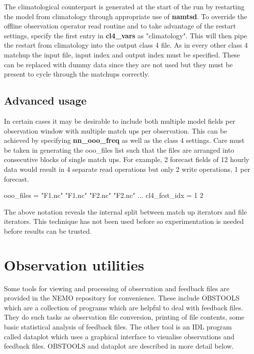 \documentclass[../main/NEMO_manual]{subfiles}
\begin{document}
The climatological counterpart is generated at the start of the run by
restarting the model from climatology through appropriate use of \textbf{namtsd}.
To override the offline observation operator read routine and to take advantage of the restart settings,
specify the first entry in \textbf{cl4\_vars} as "climatology".
This will then pipe the restart from climatology into the output class 4 file.
As in every other class 4 matchup the input file, input index and output index must be specified.
These can be replaced with dummy data since they are not used but
they must be present to cycle through the matchups correctly. 

\subsection{Advanced usage}

In certain cases it may be desirable to include both multiple model fields per observation window with
multiple match ups per observation.
This can be achieved by specifying \textbf{nn\_ooo\_freq} as well as the class 4 settings.
Care must be taken in generating the ooo\_files list such that the files are arranged into
consecutive blocks of single match ups.
For example, 2 forecast fields of 12 hourly data would result in 4 separate read operations but
only 2 write operations, 1 per forecast.

\begin{forlines}
   ooo_files = "F1.nc" "F1.nc" "F2.nc" "F2.nc"
...
   cl4_fcst_idx = 1 2
\end{forlines}

The above notation reveals the internal split between match up iterators and file iterators.
This technique has not been used before so experimentation is needed before results can be trusted.

\newpage

\section{Observation utilities}
\label{sec:OBS_obsutils}

Some tools for viewing and processing of observation and feedback files are provided in
the NEMO repository for convenience.
These include OBSTOOLS which are a collection of \fortran programs which are helpful to deal with feedback files.
They do such tasks as observation file conversion, printing of file contents,
some basic statistical analysis of feedback files.
The other tool is an IDL program called dataplot which uses a graphical interface to
visualise observations and feedback files.
OBSTOOLS and dataplot are described in more detail below.
\end{document}
